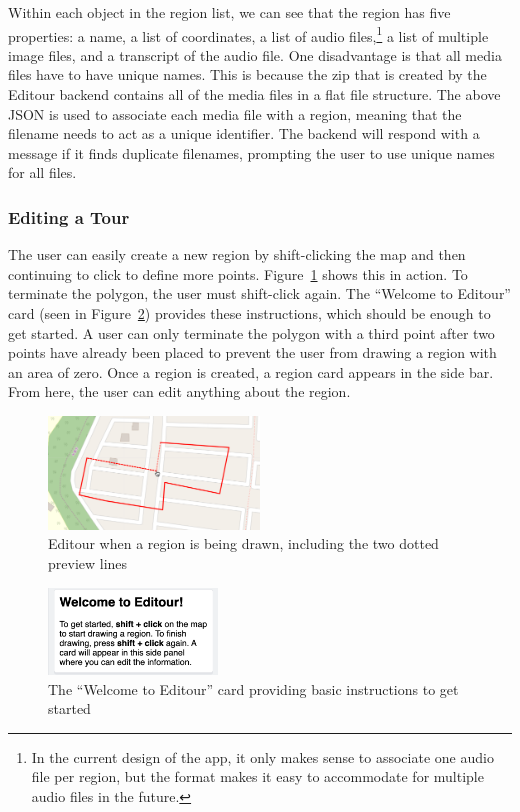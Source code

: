 \documentclass[a4paper, 10pt, american, titlepage]{article}
\begin{document}
Within each object in the region list, we can see that the region has five
properties: a name, a list of coordinates, a list of audio files,\footnote{In
the current design of the app, it only makes sense to associate one audio file
per region, but the format makes it easy to accommodate for multiple audio
files in the future.} a list of multiple image files, and a transcript of the
audio file. One disadvantage is that all media files have to have unique names.
This is because the zip that is created by the Editour backend contains all of
the media files in a flat file structure. The above JSON is used to associate
each media file with a region, meaning that the filename needs to act as a
unique identifier. The backend will respond with a message if it finds
duplicate filenames, prompting the user to use unique names for all files.

\subsubsection{Editing a Tour}
\label{sec:editingATour}

The user can easily create a new region by shift-clicking the map and then
continuing to click to define more points. Figure~\ref{fig:drawingRegion} shows
this in action. To terminate the polygon, the user must shift-click again. The
``Welcome to Editour'' card (seen in Figure~\ref{fig:welcomeCard}) provides
these instructions, which should be enough to get started. A user can only
terminate the polygon with a third point after two points have already been
placed to prevent the user from drawing a region with an area of zero. Once a
region is created, a region card appears in the side bar. From here, the user
can edit anything about the region.

\begin{figure}[h]
	\centering
	\includegraphics[width=0.5\textwidth]{drawing-region-editour.png}
	\caption{Editour when a region is being drawn, including the two dotted
		preview lines}
	\label{fig:drawingRegion}
\end{figure}

\begin{figure}[h]
	\centering
	\includegraphics[width=0.4\textwidth]{welcome-card-editour.png}
    \caption{The ``Welcome to Editour'' card providing basic instructions to
    get started}
	\label{fig:welcomeCard}
\end{figure}
\end{document}
